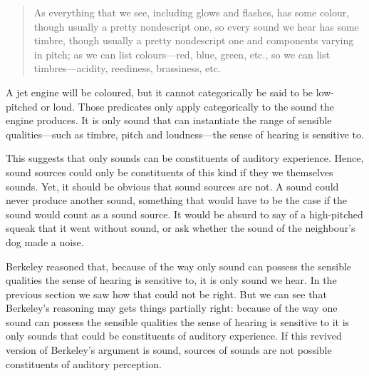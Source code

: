 \documentclass[sloppy, journal, git, bytitle, dodraft]{humapap}
\begin{document}
\begin{quote}
As everything that we see, including glows and flashes, has some colour, though usually a pretty nondescript one, so every sound we hear has some timbre, though usually a pretty nondescript one and components varying in pitch; as we can list colours---red, blue, green, etc., so we can list timbres---acidity, reediness, brassiness, etc. \autocite[p. 126]{urmson1968aa}
\end{quote}

A jet engine will be coloured, but it cannot categorically be said to be low-pitched or loud. Those predicates only apply categorically to the sound the engine produces. It is only sound that can instantiate the range of sensible qualities---such as timbre, pitch and loudness---the sense of hearing is sensitive to. 

This suggests that only sounds can be constituents of auditory experience. Hence, sound sources could only be constituents of this kind if they we themselves sounds. Yet, it should be obvious that sound sources are not. A sound could never produce another sound, something that would have to be the case if the sound would count as a sound source. It would be absurd to say of a high-pitched squeak that it went without sound, or ask whether the sound of the neighbour's dog made a noise.

Berkeley reasoned that, because of the way only sound can possess the sensible qualities the sense of hearing is sensitive to, it is only sound we hear. In the previous section we saw how that could not be right. But we can see that Berkeley's reasoning may gets things partially right: because of the way one sound can possess the sensible qualities the sense of hearing is sensitive to it is only sounds that could be constituents of auditory experience. If this revived version of Berkeley's argument is sound, sources of sounds are not possible constituents of auditory perception. 
\end{document}
